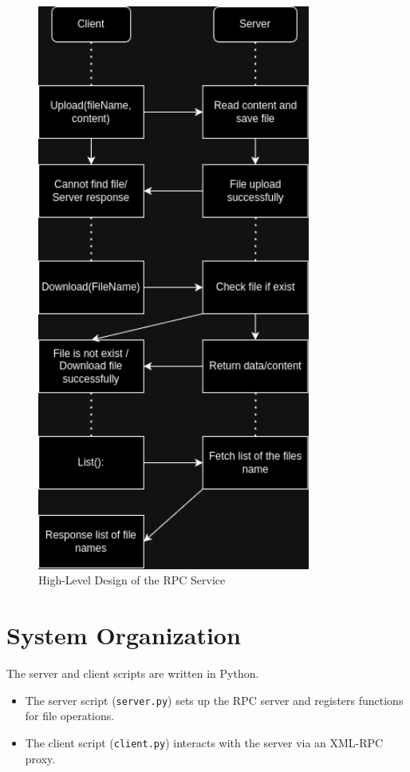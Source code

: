 \documentclass{article}
\begin{document}
	\begin{figure}
		\centering
		\includegraphics[width=0.8\textwidth]{RPC_design.png}
		\caption{High-Level Design of the RPC Service}
		\label{fig:rpc_design}
	\end{figure}
	
	\section*{System Organization}
	The server and client scripts are written in Python. 
	\begin{itemize}
		\item The server script (\texttt{server.py}) sets up the RPC server and registers functions for file operations.
		\item The client script (\texttt{client.py}) interacts with the server via an XML-RPC proxy.
	\end{itemize}
	
\end{document}
